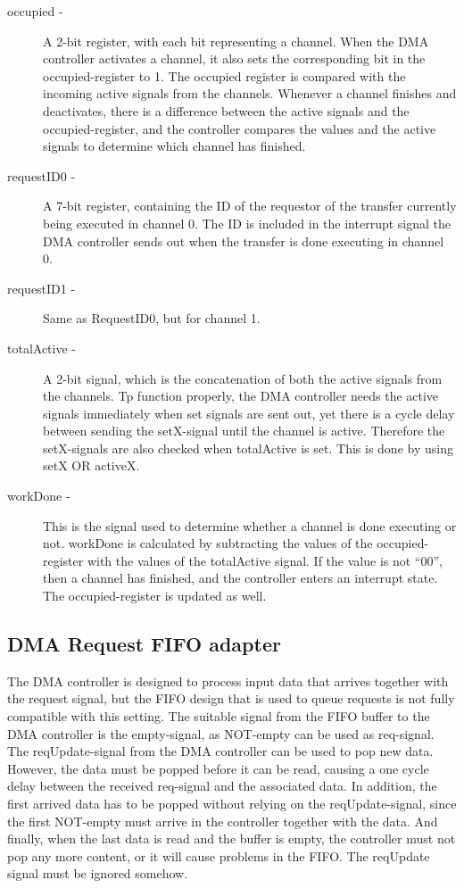 \begin{appendix}
\begin{description}
    \item[occupied -]
    A 2-bit register, with each bit representing a channel.
    When the DMA controller activates a channel, it also sets the corresponding bit in the occupied-register to 1.
    The occupied register is compared with the incoming active signals from the channels.
    Whenever a channel finishes and deactivates, there is a difference between the active signals and the occupied-register, and the controller compares the values and the active signals to determine which channel has finished.
    \item[requestID0 -]
    A 7-bit register, containing the ID of the requestor of the transfer currently being executed in channel 0.
    The ID is included in the interrupt signal the DMA controller sends out when the transfer is done executing in channel 0.
    \item[requestID1 -]
    Same as RequestID0, but for channel 1.
    \item[totalActive -]
    A 2-bit signal, which is the concatenation of both the active signals from the channels.
    Tp function properly, the DMA controller needs the active signals immediately when set signals are sent out, yet there is a cycle delay between sending the setX-signal until the channel is active.
    Therefore the setX-signals are also checked when totalActive is set.
    This is done by using setX OR activeX.
    \item[workDone - ]
    This is the signal used to determine whether a channel is done executing or not.
    workDone is calculated by subtracting the values of the occupied-register with the values of the totalActive signal.
    If the value is not ``00'', then a channel has finished, and the controller enters an interrupt state.
    The occupied-register is updated as well.
\end{description}

\subsection{DMA Request FIFO adapter}

The DMA controller is designed to process input data that arrives together with the request signal, but the FIFO design that is used to queue requests is not fully compatible with this setting.
The suitable signal from the FIFO buffer to the DMA controller is the empty-signal, as NOT-empty can be used as req-signal.
The reqUpdate-signal from the DMA controller can be used to pop new data.
However, the data must be popped before it can be read, causing a one cycle delay between the received req-signal and the associated data.
In addition, the first arrived data has to be popped without relying on the reqUpdate-signal, since the first NOT-empty must arrive in the controller together with the data.
And finally, when the last data is read and the buffer is empty, the controller must not pop any more content, or it will cause problems in the FIFO.
The reqUpdate signal must be ignored somehow.
   

\end{appendix}
